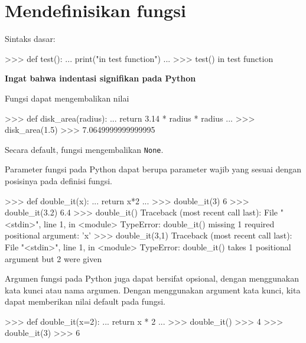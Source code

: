 \documentclass[a4paper,11pt]{extarticle}
\begin{document}
\section{Mendefinisikan fungsi}

Sintaks dasar:
\begin{pyconcode}
>>> def test():
...     print("in test function")
...
>>> test()
in test function
\end{pyconcode}

\textbf{Ingat bahwa indentasi signifikan pada Python}

Fungsi dapat mengembalikan nilai
\begin{pyconcode}
>>> def disk_area(radius):
...     return 3.14 * radius * radius
...
>>> disk_area(1.5)
>>> 7.0649999999999995
\end{pyconcode}

Secara default, fungsi mengembalikan \texttt{None}.

Parameter fungsi pada Python dapat berupa parameter wajib yang sesuai
dengan posisinya pada definisi fungsi.

\begin{pyconcode}
>>> def double_it(x):
...     return x*2
... 
>>> double_it(3)
6
>>> double_it(3.2)
6.4
>>> double_it()
Traceback (most recent call last):
  File "<stdin>", line 1, in <module>
TypeError: double_it() missing 1 required positional argument: 'x'
>>> double_it(3,1)
Traceback (most recent call last):
  File "<stdin>", line 1, in <module>
TypeError: double_it() takes 1 positional argument but 2 were given
\end{pyconcode}

Argumen fungsi pada Python juga dapat bersifat
opsional, dengan menggunakan kata kunci atau nama argumen.
Dengan menggunakan argument kata kunci, kita dapat memberikan nilai
default pada fungsi.
\begin{pyconcode}
>>> def double_it(x=2):
...     return x * 2
...
>>> double_it()
>>> 4
>>> double_it(3)
>>> 6
\end{pyconcode}
\end{document}
